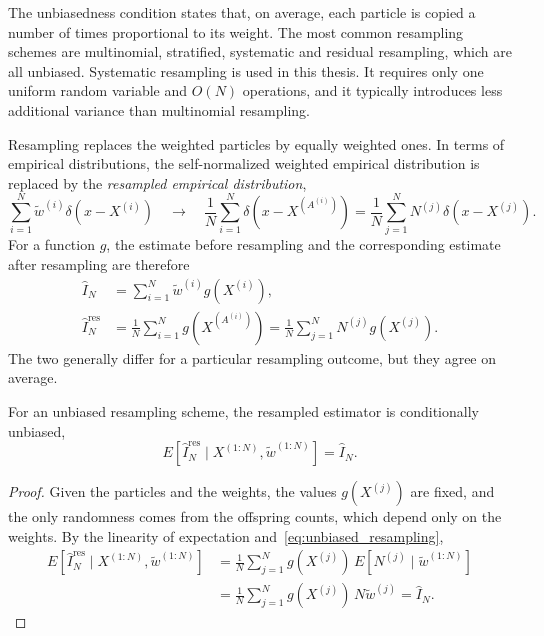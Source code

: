 The unbiasedness condition states that, on average, each particle is copied a number of times proportional to its weight. The most common resampling schemes are multinomial, stratified, systematic and residual resampling, which are all unbiased. 
Systematic resampling is used in this thesis. It requires only one uniform random variable and $O(N)$ operations, and it typically introduces less additional variance than multinomial resampling.

Resampling replaces the weighted particles by equally weighted ones. In terms of empirical distributions, the self-normalized weighted empirical distribution is replaced by the \emph{resampled empirical distribution},
\begin{equation}
    \sum_{i=1}^{N}\tilde{w}^{(i)}\delta(x-X^{(i)}) \quad \longrightarrow \quad \frac{1}{N}\sum_{i=1}^{N}\delta(x-X^{(A^{(i)})}) = \frac{1}{N}\sum_{j=1}^{N}N^{(j)}\delta(x-X^{(j)}).
    \label{eq:resampled_empirical_distribution}
\end{equation}
For a function $g$, the estimate before resampling and the corresponding estimate after resampling are therefore
\begin{align}
    \hat{I}_N &= \sum_{i=1}^{N} \tilde{w}^{(i)} g(X^{(i)}), \\
    \hat{I}_N^{\mathrm{res}} &= \frac{1}{N} \sum_{i=1}^{N} g(X^{(A^{(i)})}) = \frac{1}{N} \sum_{j=1}^{N} N^{(j)}g(X^{(j)}).
\end{align}
The two generally differ for a particular resampling outcome, but they agree on average.

\begin{proposition}
    \label{prop:resampling_unbiased}
    For an unbiased resampling scheme, the resampled estimator is conditionally unbiased,
    \begin{equation}
        E\left[\hat{I}_N^{\mathrm{res}} \mid X^{(1:N)}, \tilde{w}^{(1:N)}\right] = \hat{I}_N.
    \end{equation}
\end{proposition}
\begin{proof}
    Given the particles and the weights, the values $g(X^{(j)})$ are fixed, and the only randomness comes from the offspring counts, which depend only on the weights. By the linearity of expectation and~\eqref{eq:unbiased_resampling},
    \begin{align}
        E\left[\hat{I}_N^{\mathrm{res}} \mid X^{(1:N)}, \tilde{w}^{(1:N)}\right] &= \frac{1}{N} \sum_{j=1}^{N} g(X^{(j)})\, E\left[N^{(j)} \mid \tilde{w}^{(1:N)}\right] \\
        &= \frac{1}{N} \sum_{j=1}^{N} g(X^{(j)})\, N\tilde{w}^{(j)} = \hat{I}_N.
    \end{align}
\end{proof}

